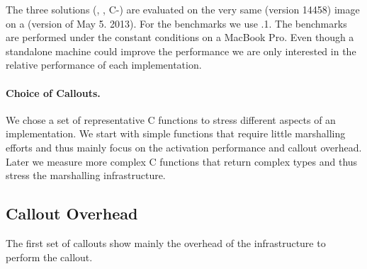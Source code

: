 The three \ST \FFI solutions (\NB, \Alien, C-\FFI) are evaluated on the very same  (version 14458) image on a \PH \VM (version of May 5. 2013).
For the \Lua benchmarks we use .1.
The benchmarks are performed under the constant conditions on a MacBook Pro.
Even though a standalone machine could improve the performance we are only interested in the relative performance of each implementation.


\paragraph{Choice of Callouts.}
We chose a set of representative C functions to stress different aspects of an \FFI implementation.
We start with simple functions that require little marshalling efforts and thus mainly focus on the activation performance and callout overhead.
Later we measure more complex C functions that return complex types and thus stress the marshalling infrastructure.

\subsection{Callout Overhead}

The first set of \FFI callouts show mainly the overhead of the \FFI infrastructure to perform the callout.

